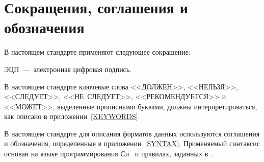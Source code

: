 \chapter{Сокращения, соглашения и обозначения}\label{DEFS}

В настоящем стандарте применяют следующее сокращение:

ЭЦП~---~электронная цифровая подпись.

В настоящем стандарте ключевые слова <<ДОЛЖЕН>>, <<НЕЛЬЗЯ>>, <<СЛЕДУЕТ>>, 
<<НЕ~СЛЕДУЕТ>>, <<РЕКОМЕНДУЕТСЯ>> и <<МОЖЕТ>>, выделенные прописными 
буквами, должны интерпретироваться, как описано в 
приложении~\ref{KEYWORDS}.

В настоящем стандарте для описания форматов данных используются соглашения 
и обозначения, определенные в приложении~\ref{SYNTAX}. Применяемый 
синтаксис основан на языке программирования Си~\cite{ISO9899} и правилах, 
заданных в~\cite{RFC4506}. 




